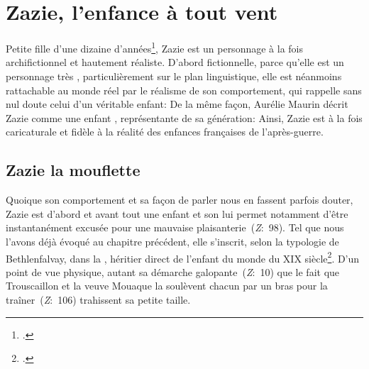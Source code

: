 \section{Zazie, l'enfance à tout vent}
Petite fille d'une dizaine d'années\footcite[88]{Maurin2007}, Zazie est un personnage à la fois archifictionnel et hautement réaliste.
D'abord fictionnelle, parce qu'elle est un personnage très , particulièrement sur le plan linguistique, elle est néanmoins rattachable au monde réel par le réalisme de son comportement, qui rappelle sans nul doute celui d'un  véritable enfant:
De la même façon, Aurélie Maurin décrit Zazie comme une enfant , représentante de sa génération:
Ainsi, Zazie est à la fois caricaturale et fidèle à la réalité des enfances françaises de l'après-guerre.


\subsection{Zazie la mouflette}
Quoique son comportement et sa façon de parler nous en fassent parfois douter, Zazie est d'abord et avant tout une enfant et son  lui permet notamment d'être instantanément excusée pour une mauvaise plaisanterie~(\textit{Z}:~98).
Tel que nous l'avons déjà évoqué au chapitre précédent, elle s'inscrit, selon la typologie de Bethlenfalvay, dans la , héritier direct de l'enfant du monde du XIX siècle\footcite[117]{Bethlenfalvay1979}.
D'un point de vue physique, autant sa démarche galopante~(\textit{Z}:~10) que le fait que Trouscaillon et la veuve Mouaque la soulèvent chacun par un bras pour la traîner~(\textit{Z}:~106) trahissent sa petite taille.

